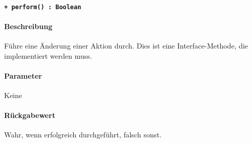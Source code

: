 \paragraph{\texttt{+ perform() : Boolean}}\label{AP_Change_perform}%
\paragraph*{Beschreibung}
Führe eine Änderung einer Aktion durch.
Dies ist eine Interface-Methode, die implementiert werden muss.
\paragraph*{Parameter}
Keine
\paragraph*{Rückgabewert}
Wahr, wenn erfolgreich durchgeführt, falsch sonst.
